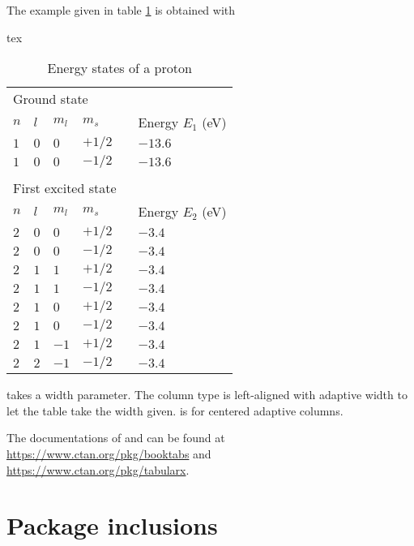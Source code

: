 \documentclass[a4paper, 11pt]{old-dms}
\begin{document}
{{The example given in table \ref{tab:energy} is obtained with
\begin{codeboxnonos}{tex}
\begin{table}[ht!]
    \centering
    \caption{Energy states of a proton}
    \label{tab:energy}
    \begin{tabularx}{.6\textwidth}{llllXl}
        \toprule
        \midrule
        \multicolumn{6}{l}{Ground state} \\
        $n$ & $l$ & $m_l$ & $m_s$ &  & Energy $E_1$ (eV)\\
        \midrule
        $1$ & $0$ & $0$ & $+1/2$ & & $- 13.6$ \\
        $1$ & $0$ & $0$ & $-1/2$ & & $- 13.6$ \\
         & & & & & \\
        \multicolumn{6}{l}{First excited state} \\
        $n$ & $l$ & $m_l$ & $m_s$ &  & Energy $E_2$ (eV)\\
        \midrule
        $2$ & $0$ & $0$ & $+1/2$ & & $-3.4$ \\
        $2$ & $0$ & $0$ & $-1/2$ & & $-3.4$ \\
        $2$ & $1$ & $1$ & $+1/2$ & & $-3.4$ \\
        $2$ & $1$ & $1$ & $-1/2$ & & $-3.4$ \\
        $2$ & $1$ & $0$ & $+1/2$ & & $-3.4$ \\
        $2$ & $1$ & $0$ & $-1/2$ & & $-3.4$ \\
        $2$ & $1$ & $-1$ & $+1/2$ & & $-3.4$ \\
        $2$ & $2$ & $-1$ & $-1/2$ & & $-3.4$ \\
        \midrule
        \bottomrule
    \end{tabularx}
\end{table}
\end{codeboxnonos}

 takes a width parameter. The column type  is left-aligned with adaptive width to let the table take the width given.  is for centered adaptive columns.

The documentations of  and  can be found at\\ \url{https://www.ctan.org/pkg/booktabs} and\\ \url{https://www.ctan.org/pkg/tabularx}.


\section{Package inclusions}

}}
\end{document}

